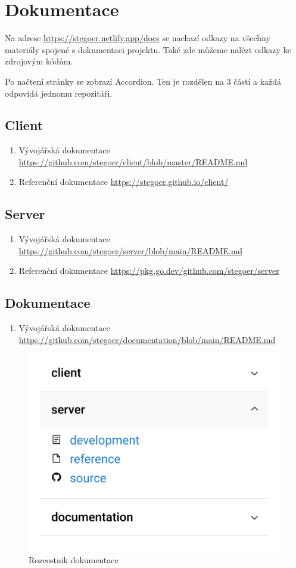 
\section{Dokumentace}\label{sec:dokumentace}

Na adrese \url{https://stegoer.netlify.app/docs} se nachazí odkazy na všechny
materiály spojené s dokumentaci projektu.
Také zde můžeme nalézt odkazy ke zdrojovým kódům.

Po načtení stránky se zobrazí Accordion\cite{enwiki:accordion}.
Ten je rozdělen na 3 částí a každá odpovídá jednomu repozitáři.

\subsection{Client}\label{subsec:doc-client}
\begin{enumerate}
    \item Vývojářská dokumentace \url{https://github.com/stegoer/client/blob/master/README.md}
    \item Referenční dokumentace \url{https://stegoer.github.io/client/}
\end{enumerate}

\subsection{Server}\label{subsec:doc-server}
\begin{enumerate}
    \item Vývojářská dokumentace \url{https://github.com/stegoer/server/blob/main/README.md}
    \item Referenční dokumentace \url{https://pkg.go.dev/github.com/stegoer/server}
\end{enumerate}

\subsection{Dokumentace}\label{subsec:doc-dokumentace}
\begin{enumerate}
    \item Vývojářská dokumentace \url{https://github.com/stegoer/documentation/blob/main/README.md}
\end{enumerate}

\begin{figure}
    \centering
    \includegraphics[scale=0.3]{assets/images/docs-accordion}
    \caption{Rozcestnik dokumentace}\label{fig:rozcestnik-dokumentace}
\end{figure}
